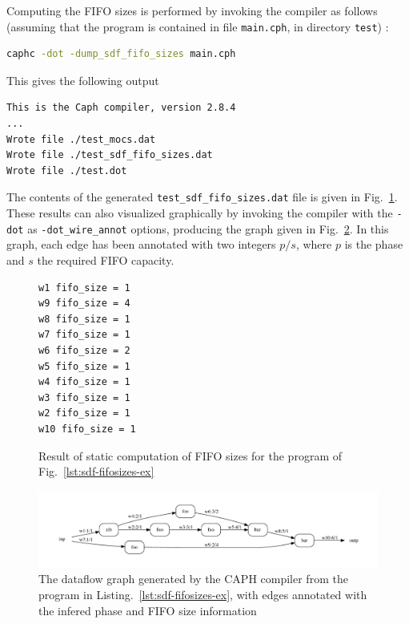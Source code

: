 Computing the FIFO sizes is performed by invoking the compiler as follows (assuming that the program is
contained in file \verb|main.cph|, in directory \verb|test|) :

\begin{lstlisting}[language=bash]
caphc -dot -dump_sdf_fifo_sizes main.cph
\end{lstlisting}

\noindent
This gives the following output 

\begin{lstlisting}[language=bash,basicstyle=\small]
This is the Caph compiler, version 2.8.4
...
Wrote file ./test_mocs.dat
Wrote file ./test_sdf_fifo_sizes.dat
Wrote file ./test.dot
\end{lstlisting}

The contents of the generated \verb|test_sdf_fifo_sizes.dat| file is given in
Fig.~\ref{fig:sdf-fifosizes-res}.  These results can also visualized graphically by invoking the
compiler with the \verb|-dot| as \verb|-dot_wire_annot| options, producing the graph given in
Fig.~\ref{fig:sdf-fifosizes-dfg}. In this graph, each edge has been annotated with two integers
$p/s$, where $p$ is the phase and $s$ the required FIFO capacity.

\begin{figure}[H]
  \centering
\begin{verbatim}
w1 fifo_size = 1
w9 fifo_size = 4
w8 fifo_size = 1
w7 fifo_size = 1
w6 fifo_size = 2
w5 fifo_size = 1
w4 fifo_size = 1
w3 fifo_size = 1
w2 fifo_size = 1
w10 fifo_size = 1
\end{verbatim}
  \caption{Result of static computation of FIFO sizes for the program of Fig.~\ref{lst:sdf-fifosizes-ex}}
  \label{fig:sdf-fifosizes-res}
\end{figure}

\begin{figure}[h]
  \centering
  \includegraphics[width=\textwidth]{figs/sdf-fifosizes-ex}
  \caption{The dataflow graph generated by the CAPH compiler from the program in
    Listing.~\ref{lst:sdf-fifosizes-ex}, with edges annotated with the infered phase and FIFO size information}
  \label{fig:sdf-fifosizes-dfg}
\end{figure}
